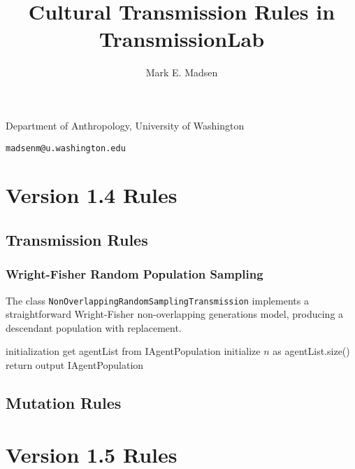 \documentclass{article}
\begin{document}
\title{Cultural Transmission Rules in TransmissionLab} 
\maketitle


\author{Mark E. Madsen}


Department of Anthropology, University of Washington

\texttt{madsenm@u.washington.edu}


\section{Version 1.4 Rules}
\subsection{Transmission Rules}
\subsubsection{Wright-Fisher Random Population Sampling}
The class \texttt{NonOverlappingRandomSamplingTransmission} implements a straightforward Wright-Fisher non-overlapping generations model, producing a descendant population with replacement.  


\begin{algorithm}[H]
\SetLine
{}
initialization\;
get agentList from IAgentPopulation\;
initialize $n$ as agentList.size()\;
return output IAgentPopulation\;
\end{algorithm}

\subsection{Mutation Rules}


\section{Version 1.5 Rules}
\end{document}
